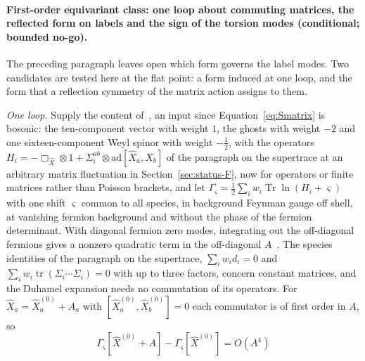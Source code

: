 \paragraph{First-order equivariant class: one loop about commuting matrices, the reflected form on labels and the sign of the torsion modes (conditional; bounded no-go).}
The preceding paragraph leaves open which form governs the label modes. Two candidates are tested here at the flat point: a form induced at one loop, and the form that a reflection symmetry of the matrix action assigns to them.

\emph{One loop.} Supply the content of~\cite{IKKT1997}, an input since Equation~\eqref{eq:Smatrix} is bosonic: the ten-component vector with weight \(1\), the ghosts with weight \(-2\) and one sixteen-component Weyl spinor with weight \(-\tfrac12\), with the operators \(H_i=-\Box_{\hat X}\otimes1+\Sigma_i^{ab}\otimes\mathrm{ad}[\hat X_a,\hat X_b]\) of the paragraph on the supertrace at an arbitrary matrix fluctuation in Section~\ref{sec:status-F}, now for operators or finite matrices rather than Poisson brackets, and let \(\Gamma_\varsigma=\tfrac12\sum_iw_i\operatorname{Tr}\ln(H_i+\varsigma)\) with one shift \(\varsigma\) common to all species, in background Feynman gauge off shell, at vanishing fermion background and without the phase of the fermion determinant. With diagonal fermion zero modes, integrating out the off-diagonal fermions gives a nonzero quadratic term in the off-diagonal \(A\)~\cite{AokiIsoKawaiKitazawaTada1998}. The species identities of the paragraph on the supertrace, \(\sum_iw_id_i=0\) and \(\sum_iw_i\operatorname{tr}(\Sigma_i\cdots\Sigma_i)=0\) with up to three factors, concern constant matrices, and the Duhamel expansion needs no commutation of its operators. For \(\hat X_a=\hat X^{(0)}_a+A_a\) with \([\hat X^{(0)}_a,\hat X^{(0)}_b]=0\) each commutator is of first order in \(A\), so
\[
\Gamma_\varsigma[\hat X^{(0)}+A]-\Gamma_\varsigma[\hat X^{(0)}]=O(A^4)
\]
